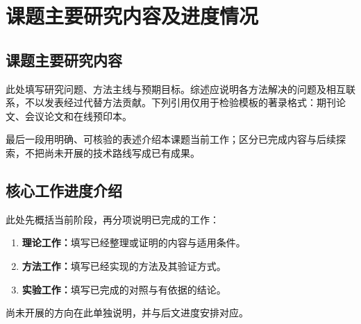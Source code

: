 \section{课题主要研究内容及进度情况}
\subsection{课题主要研究内容}
此处填写研究问题、方法主线与预期目标。综述应说明各方法解决的问题及相互联系，不以发表经过代替方法贡献。下列引用仅用于检验模板的著录格式：期刊论文\cite{gordon1993novel}、会议论文\cite{gu2015neural}和在线预印本\cite{krishnan2015deep}。

最后一段用明确、可核验的表述介绍本课题当前工作；区分已完成内容与后续探索，不把尚未开展的技术路线写成已有成果。

\subsection{核心工作进度介绍}
此处先概括当前阶段，再分项说明已完成的工作：
\begin{enumerate}[label=(\arabic*),leftmargin=2.5em,topsep=3pt,itemsep=2pt,parsep=0pt]
  \item \textbf{理论工作：}填写已经整理或证明的内容与适用条件。
  \item \textbf{方法工作：}填写已经实现的方法及其验证方式。
  \item \textbf{实验工作：}填写已完成的对照与有依据的结论。
\end{enumerate}
尚未开展的方向在此单独说明，并与后文进度安排对应。
